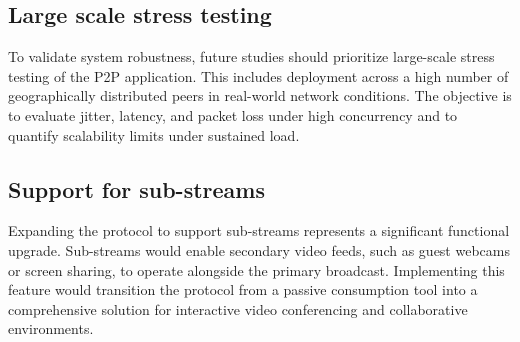 \subsection{Large scale stress testing}
To validate system robustness, future studies should prioritize large-scale stress testing of the \ac{P2P} application. This includes deployment across a high number of geographically distributed peers in real-world network conditions. The objective is to evaluate jitter, latency, and packet loss under high concurrency and to quantify scalability limits under sustained load.
\subsection{Support for sub-streams}
Expanding the protocol to support sub-streams represents a significant functional upgrade. Sub-streams would enable secondary video feeds, such as guest webcams or screen sharing, to operate alongside the primary broadcast. Implementing this feature would transition the protocol from a passive consumption tool into a comprehensive solution for interactive video conferencing and collaborative environments.